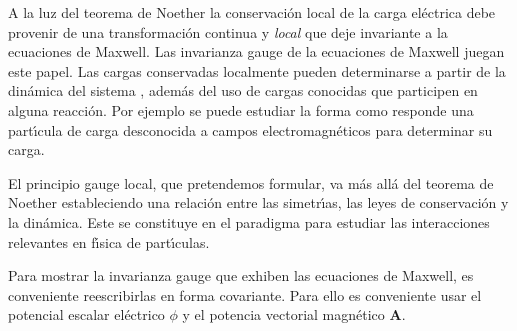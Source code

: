A la luz del teorema de Noether la conservaci\'on local de la carga el\'ectrica debe provenir de una transformaci\'on continua y \emph{local} que deje invariante a la ecuaciones de Maxwell. Las invarianza gauge de la ecuaciones de Maxwell juegan este papel. Las cargas conservadas localmente pueden determinarse a partir de la din\'amica del sistema  \cite{Aitchison:2003tq}, adem\'as del uso de cargas conocidas que participen en alguna reacci\'on. Por ejemplo se puede estudiar la forma como responde una part\'\i cula de carga desconocida a campos electromagn\'eticos para determinar su carga. 

El principio gauge local, que pretendemos formular, va m\'as all\'a del teorema de Noether estableciendo una relaci\'on entre las simetr\'\i as, las leyes de conservaci\'on y la din\'amica. Este se constituye en el paradigma para estudiar las interacciones relevantes en f\'\i sica de part\'\i culas.

Para mostrar la invarianza gauge que exhiben las ecuaciones de Maxwell, es conveniente reescribirlas en forma covariante. Para ello es conveniente usar el potencial escalar el\'ectrico $\phi$ y el potencia vectorial magn\'etico $\mathbf{A}$.

